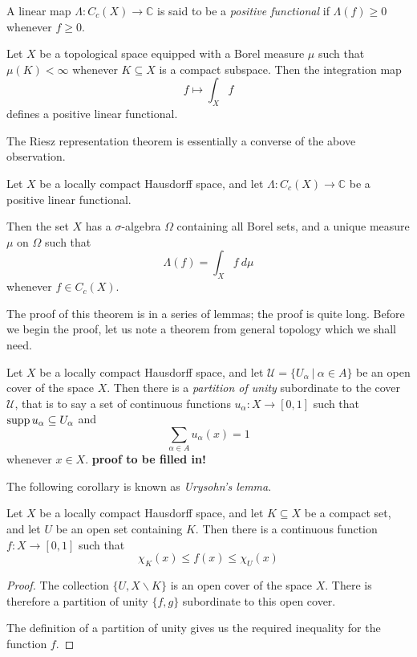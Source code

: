 \begin{definition}
A linear map $\Lambda \colon C_c (X) \rightarrow {\mathbb C}$ is said to be a {\em positive functional} if $\Lambda (f) \geq 0$ whenever $f\geq 0$.
\end{definition}

Let $X$ be a topological space equipped with a Borel measure $\mu$ such that $\mu (K) <\infty$ whenever $K\subseteq X$ is a compact subspace.  Then the integration map
$$f\mapsto \int_X f$$
defines a positive linear functional.

The Riesz representation theorem is essentially a converse of the above observation.

\begin{theorem}
Let $X$ be a locally compact Hausdorff space, and let $\Lambda \colon C_c (X) \rightarrow {\mathbb C}$ be a positive linear functional.

Then the set $X$ has a $\sigma$-algebra $\Omega$ containing all Borel sets, and a unique measure $\mu$ on $\Omega$ such that
$$\Lambda (f) = \int_X f\ d\mu$$
whenever $f\in C_c (X)$.
\end{theorem}

The proof of this theorem is in a series of lemmas; the proof is quite long.  Before we begin the proof, let us note a theorem from general topology which we shall need.

\begin{theorem} \label{partition}
Let $X$ be a locally compact Hausdorff space, and let ${\mathcal U} = \{ U_\alpha \ |\ \alpha \in A \}$ be an open cover of the space $X$.  Then there is a {\em partition of unity} subordinate to the cover $\mathcal U$, that is to say a set of continuous functions $u_\alpha \colon X\rightarrow [0,1]$ such that $\operatorname{supp} u_\alpha \subseteq U_\alpha$ and
$$\sum_{\alpha \in A} u_\alpha (x) =1$$
whenever $x\in X$.
\textbf{proof to be filled in!}
\end{theorem}

The following corollary is known as {\em Urysohn's lemma}.

\begin{corollary}
Let $X$ be a locally compact Hausdorff space, and let $K\subseteq X$ be a compact set, and let $U$ be an open set containing $K$.  Then there is a continuous function $f\colon X\rightarrow [0,1]$
such that
$$\chi_K(x) \leq f(x) \leq \chi_U (x)$$
\end{corollary}

\begin{proof}
The collection $\{ U, X\backslash K \}$ is an open cover of the space $X$.  There is therefore a partition of unity $\{ f,g\}$ subordinate to this open cover.

The definition of a partition of unity gives us the required inequality for the function $f$.
\end{proof}

